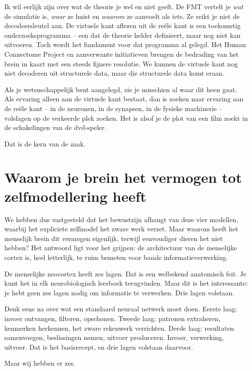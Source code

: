 \documentclass[11pt, twoside, openright]{book}
\begin{document}
Ik wil eerlijk zijn over wat de theorie je wel en niet geeft. De FMT vertelt je \textit{wat} de simulatie is, \textit{waar} ze huist en \textit{waarom} ze aanvoelt als iets. Ze reikt je niet de decodeersleutel aan. De virtuele kant aflezen uit de reële kant is een toekomstig onderzoeksprogramma -- een dat de theorie helder definieert, maar nog niet kan uitvoeren. Toch wordt het fundament voor dat programma al gelegd. Het Human Connectome Project en aanverwante initiatieven brengen de bedrading van het brein in kaart met een steeds fijnere resolutie. We kunnen de virtuele kant nog niet decoderen uit structurele data, maar die structurele data komt eraan.

Als je wetenschappelijk bent aangelegd, zie je misschien al waar dit heen gaat. Als ervaring alleen aan de virtuele kant bestaat, dan is zoeken naar ervaring aan de reële kant -- in de neuronen, in de synapsen, in de fysieke machinerie -- volslagen op de verkeerde plek zoeken. Het is alsof je de plot van een film zoekt in de schakelingen van de dvd-speler.

Dat is de kern van de zaak.

\section*{Waarom je brein het vermogen tot zelfmodellering heeft}

We hebben dus vastgesteld dat het bewustzijn afhangt van deze vier modellen, waarbij het expliciete zelfmodel het zware werk verzet. Maar waarom heeft het menselijk brein dit vermogen eigenlijk, terwijl eenvoudiger dieren het niet hebben? Het antwoord ligt voor het grijpen: de architectuur van de menselijke cortex is, heel letterlijk, te ruim bemeten voor basale informatieverwerking.

De menselijke neocortex heeft zes lagen. Dat is een welbekend anatomisch feit. Je kunt het in elk neurobiologisch leerboek terugvinden. Maar dit is het interessante: je hebt geen zes lagen nodig om informatie te verwerken. Drie lagen volstaan.

Denk eens na over wat een standaard neuraal netwerk moet doen. Eerste laag: invoer ontvangen, filteren, opschonen. Tweede laag: patronen extraheren, kenmerken herkennen, het zware rekenwerk verrichten. Derde laag: resultaten samenvoegen, beslissingen nemen, uitvoer produceren. Invoer, verwerking, uitvoer. Dat is het basisrecept, en drie lagen volstaan daarvoor.

Maar wij hebben er zes.
\end{document}
